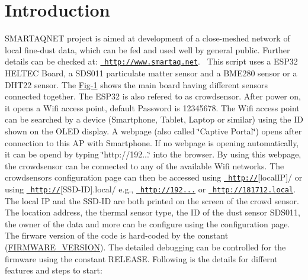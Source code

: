 \hypertarget{index_intro}{}\section{Introduction}\label{index_intro}
S\+M\+A\+R\+T\+A\+Q\+N\+ET project is aimed at development of a close-\/meshed network of local fine-\/dust data, which can be fed and used well by general public. Further details can be checked at\+: \href{http://www.smartaq.net}{\texttt{ http\+://www.\+smartaq.\+net}}.~\newline
 This script uses a E\+S\+P32 H\+E\+L\+T\+EC Board, a S\+D\+S011 particulate matter sensor and a B\+M\+E280 sensor or a D\+H\+T22 sensor. The \mbox{\hyperlink{index_Fig-1}{Fig-\/1}} shows the main board having different sensors connected together. The E\+S\+P32 is also refered to as crowdsensor. After power on, it opens a Wifi access point, default Password is 12345678. The Wifi access point can be searched by a device (Smartphone, Tablet, Laptop or similar) using the ID shown on the O\+L\+ED display. A webpage (also called \char`\"{}\+Captive Portal\char`\"{}) opens after connection to this AP with Smartphone. If no webpage is opening automatically, it can be opend by typing \char`\"{}http\+://192...\char`\"{} into the browser. By using this webpage, the crowdsensor can be connected to any of the available Wifi networks. The crowdsensors configuration page can then be accessed using \href{http://}{\texttt{ http\+://}}\mbox{[}local\+IP\mbox{]}/ or using \href{http://}{\texttt{ http\+://}}\mbox{[}S\+S\+D-\/\+ID\mbox{]}.local/ e.\+g., \href{http://192.168.0.39}{\texttt{ http\+://192...}} or \href{http://181712.local}{\texttt{ http\+://181712.\+local}}. The local IP and the S\+S\+D-\/\+ID are both printed on the screen of the crowd sensor. The location address, the thermal sensor type, the ID of the dust sensor S\+D\+S011, the owner of the data and more can be configure using the configuration page. The firware version of the code is hard-\/coded by the constant (\mbox{\hyperlink{main_8h_aa14dc39d52ab121ceb570f1a265385e0}{F\+I\+R\+M\+W\+A\+R\+E\+\_\+\+V\+E\+R\+S\+I\+ON}}). The detailed debugging can be controlled for the firmware using the constant R\+E\+L\+E\+A\+SE. Following is the details for differnt features and steps to start\+:~\newline

